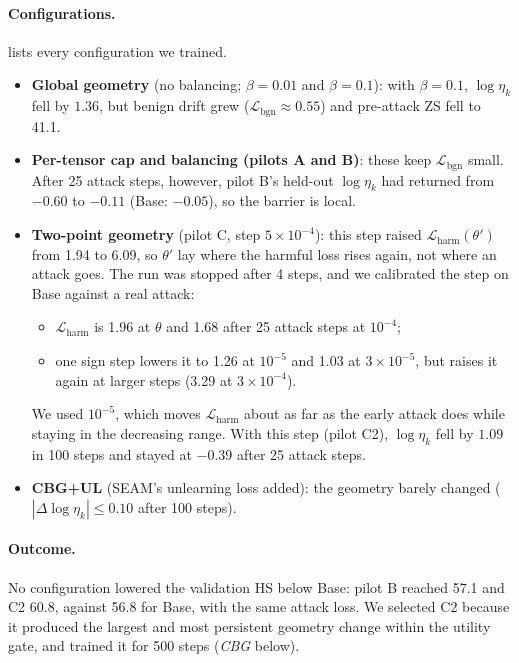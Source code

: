 \documentclass[11pt]{article}
\newcommand{\Lbgn}{\mathcal{L}_{\mathrm{bgn}}}
\newcommand{\etak}{\eta_{k}}
\begin{document}
\paragraph{Configurations.}
 lists every configuration we trained.
\begin{itemize}
  \item \textbf{Global geometry} (no balancing; $\beta=0.01$ and $\beta=0.1$): with $\beta=0.1$, $\log\etak$ fell by $1.36$, but benign drift grew ($\Lbgn\approx0.55$) and pre-attack ZS fell to 41.1.
  \item \textbf{Per-tensor cap and balancing (pilots A and B)}: these keep $\Lbgn$ small. After 25 attack steps, however, pilot B's held-out $\log\etak$ had returned from $-0.60$ to $-0.11$ (Base: $-0.05$), so the barrier is local.
  \item \textbf{Two-point geometry} (pilot C, step $5\times10^{-4}$): this step raised $\mathcal L_{\mathrm{harm}}(\theta')$ from 1.94 to 6.09, so $\theta'$ lay where the harmful loss rises again, not where an attack goes. The run was stopped after 4 steps, and we calibrated the step on Base against a real attack:
    \begin{itemize}
      \item $\mathcal L_{\mathrm{harm}}$ is 1.96 at $\theta$ and 1.68 after 25 attack steps at $10^{-4}$;
      \item one sign step lowers it to 1.26 at $10^{-5}$ and 1.03 at $3\times10^{-5}$, but raises it again at larger steps (3.29 at $3\times10^{-4}$).
    \end{itemize}
    We used $10^{-5}$, which moves $\mathcal L_{\mathrm{harm}}$ about as far as the early attack does while staying in the decreasing range. With this step (pilot C2), $\log\etak$ fell by $1.09$ in 100 steps and stayed at $-0.39$ after 25 attack steps.
  \item \textbf{CBG+UL} (SEAM's unlearning loss added): the geometry barely changed ($|\Delta\log\etak|\le0.10$ after 100 steps).
\end{itemize}

\paragraph{Outcome.}
No configuration lowered the validation HS below Base: pilot B reached 57.1 and C2 60.8, against 56.8 for Base, with the same attack loss. We selected C2 because it produced the largest and most persistent geometry change within the utility gate, and trained it for 500 steps (\emph{CBG} below).
\end{document}
